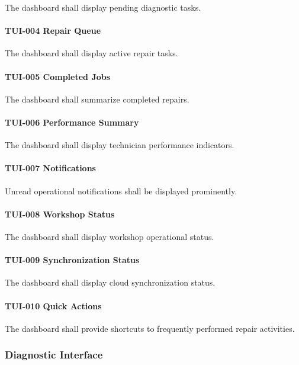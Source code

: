 The dashboard shall display pending diagnostic tasks.

\paragraph{TUI-004 Repair Queue}

The dashboard shall display active repair tasks.

\paragraph{TUI-005 Completed Jobs}

The dashboard shall summarize completed repairs.

\paragraph{TUI-006 Performance Summary}

The dashboard shall display technician performance indicators.

\paragraph{TUI-007 Notifications}

Unread operational notifications shall be displayed prominently.

\paragraph{TUI-008 Workshop Status}

The dashboard shall display workshop operational status.

\paragraph{TUI-009 Synchronization Status}

The dashboard shall display cloud synchronization status.

\paragraph{TUI-010 Quick Actions}

The dashboard shall provide shortcuts to frequently performed repair
activities.


\subsubsection*{Diagnostic Interface}

